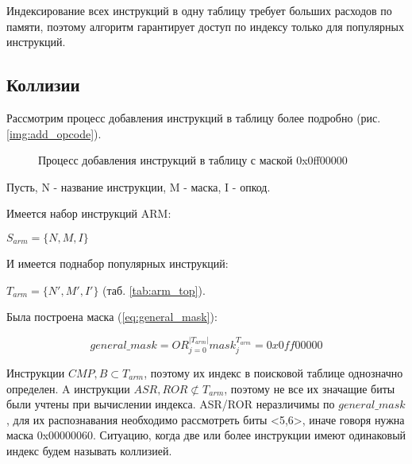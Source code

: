 Индексирование всех инструкций в одну таблицу требует больших расходов по памяти, поэтому алгоритм гарантирует доступ по индексу только для популярных инструкций.

 \subsection{Коллизии}
 
 Рассмотрим процесс добавления инструкций в таблицу более подробно (рис. \ref{img:add_opcode}).
 
 \begin{figure}[h!] \label{img:add_opcode}
    \caption{Процесс добавления инструкций в таблицу с маской 0x0ff00000}
    \label{img:add_opcode_sheme}
\end{figure}

Пусть, N - название инструкции, M - маска, I - опкод.

Имеется набор инструкций ARM: 

$S_{arm}=\{N, M, I\}$

И имеется поднабор популярных инструкций:

 $T_{arm}=\{N', M', I'\}$ (таб. \ref{tab:arm_top}).
 
Была построена маска (\ref{eq:general_mask}):

\begin{equation*}
	general\_mask=OR_{j=0}^{|T_{arm}|}mask_j^{T_{arm}} = 0x0ff00000
\end{equation*}

Инструкции $CMP,B \subset T_{arm}$, поэтому их индекс в поисковой таблице однозначно определен. A инструкции $ASR, ROR \not \subset T_{arm}$, поэтому не все их значащие биты были учтены при вычислении индекса. ASR/ROR неразличимы по $general\_mask$, для их распознавания необходимо рассмотреть биты <5,6>, иначе говоря нужна маска 0x00000060. Ситуацию, когда две или более инструкции имеют одинаковый индекс будем называть коллизией. 


